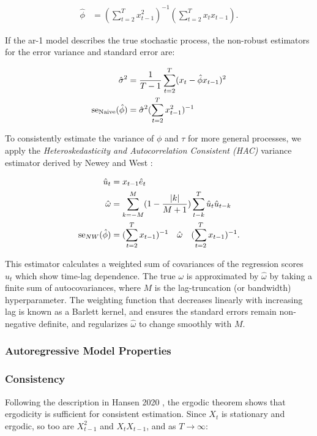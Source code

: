 \documentclass[main.tex]{subfiles}
\begin{document}
\begin{align}
    \hat\phi &= (\sum_{t=2}^T x_{t-1}^2)^{-1} (\sum_{t=2}^T x_t x_{t-1}).
\end{align}

If the ar-1 model describes the true stochastic process, the non-robust estimators for the error variance and standard error are: 

\begin{align}
    \hat\sigma^2 &= \frac{1}{T-1} \sum_{t=2}^T (x_t - \hat\phi x_{t-1})^2 \notag\\
    \text{se}_\text{Naive}(\hat\phi) &= \hat\sigma^2 (\sum_{t=2}^T x_{t-1}^2)^{-1}
\end{align}

To consistently estimate the variance of $\phi$ and $\tau$ for more general processes, we apply the \textit{Heteroskedasticity and Autocorrelation Consistent (HAC)} variance estimator derived by Newey and West \cite{newey_simple_1987}:

\begin{align}
    \hat u_t &= x_{t-1} \hat e_t \notag\\
    \hat \omega &= \sum_{k=-M}^M (1 - \frac{|k|}{M+1}) \sum_{t-k}^T \hat u_t \hat u_{t-k} \notag\\
    \text{se}_{NW}(\hat\phi) &= (\sum_{t=2}^T x_{t-1})^{-1} \quad \hat \omega \quad (\sum_{t=2}^T x_{t-1})^{-1}.
\end{align}

This estimator calculates a weighted sum of covariances of the regression scores $\hat u_t$ which show time-lag dependence. The true $\omega$ is approximated by $\hat \omega$ by taking a finite sum of autocovariances, where $M$ is the lag-truncation (or bandwidth) hyperparameter. The weighting function that decreases linearly with increasing lag is known as a Barlett kernel, and ensures the standard errors remain non-negative definite, and regularizes $\hat \omega$ to change smoothly with $M$.

\subsubsection*{Autoregressive Model Properties}
\subsubsection*{Consistency}
Following the description in Hansen 2020 \cite{hansen_econometrics_2020}, the ergodic theorem shows that ergodicity is sufficient for consistent estimation. Since $X_t$ is stationary and ergodic, so too are $X_{t-1}^2$ and $X_t X_{t-1}$, and as $T \to \infty$:
\end{document}
